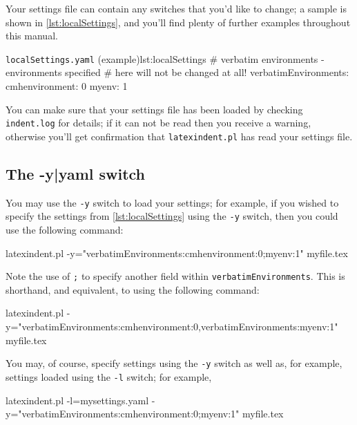  Your settings file can contain any switches that you'd like to change; a sample is shown
 in \cref{lst:localSettings}, and you'll find plenty of further examples throughout this
 manual. 

 \begin{yaml}{\texttt{localSettings.yaml} (example)}{lst:localSettings}
#  verbatim environments - environments specified
#  here will not be changed at all!
verbatimEnvironments:
    cmhenvironment: 0
    myenv: 1
\end{yaml}

 You can make sure that your settings file has been loaded by checking
 \texttt{indent.log} for details; if it can not be read then you receive a warning,
 otherwise you'll get confirmation that \texttt{latexindent.pl} has read your settings
 file.

\subsection{The -y|yaml switch}\label{sec:yamlswitch}
 You%
 may use the \texttt{-y} switch to load your settings;  for example, if you wished to
 specify the settings from \cref{lst:localSettings} using the \texttt{-y} switch, then you
 could use the following command:

 \begin{commandshell}
latexindent.pl -y="verbatimEnvironments:cmhenvironment:0;myenv:1" myfile.tex
\end{commandshell}

 Note the use of \texttt{;} to specify another field within
 \texttt{verbatimEnvironments}. This is shorthand, and equivalent, to using the following
 command: 

 \begin{commandshell}
latexindent.pl -y="verbatimEnvironments:cmhenvironment:0,verbatimEnvironments:myenv:1" myfile.tex
\end{commandshell}

 You may, of course, specify settings using the \texttt{-y} switch as well as, for
 example, settings loaded using the \texttt{-l} switch; for example,  

 \begin{commandshell}
latexindent.pl -l=mysettings.yaml -y="verbatimEnvironments:cmhenvironment:0;myenv:1" myfile.tex
\end{commandshell}

